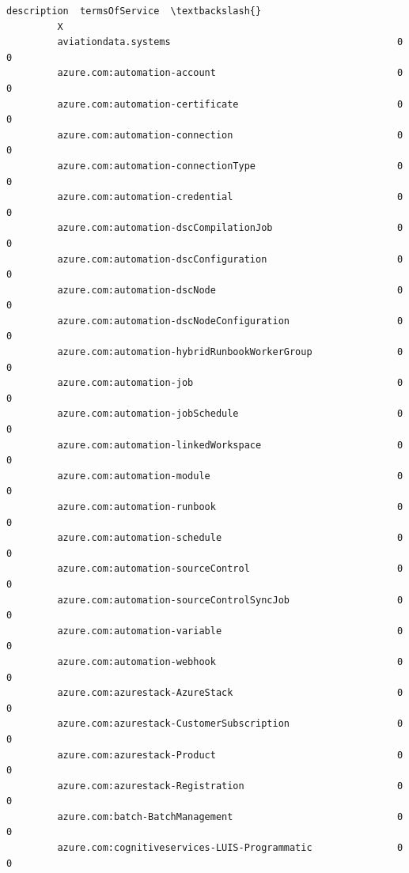 \documentclass[11pt]{article}
\begin{document}
\begin{Verbatim}[commandchars=\\\{\}]
                                                           description  termsOfService  \textbackslash{}
         X                                                                               
         aviationdata.systems                                        0               0   
         azure.com:automation-account                                0               0   
         azure.com:automation-certificate                            0               0   
         azure.com:automation-connection                             0               0   
         azure.com:automation-connectionType                         0               0   
         azure.com:automation-credential                             0               0   
         azure.com:automation-dscCompilationJob                      0               0   
         azure.com:automation-dscConfiguration                       0               0   
         azure.com:automation-dscNode                                0               0   
         azure.com:automation-dscNodeConfiguration                   0               0   
         azure.com:automation-hybridRunbookWorkerGroup               0               0   
         azure.com:automation-job                                    0               0   
         azure.com:automation-jobSchedule                            0               0   
         azure.com:automation-linkedWorkspace                        0               0   
         azure.com:automation-module                                 0               0   
         azure.com:automation-runbook                                0               0   
         azure.com:automation-schedule                               0               0   
         azure.com:automation-sourceControl                          0               0   
         azure.com:automation-sourceControlSyncJob                   0               0   
         azure.com:automation-variable                               0               0   
         azure.com:automation-webhook                                0               0   
         azure.com:azurestack-AzureStack                             0               0   
         azure.com:azurestack-CustomerSubscription                   0               0   
         azure.com:azurestack-Product                                0               0   
         azure.com:azurestack-Registration                           0               0   
         azure.com:batch-BatchManagement                             0               0   
         azure.com:cognitiveservices-LUIS-Programmatic               0               0   

\end{Verbatim}
\end{document}
